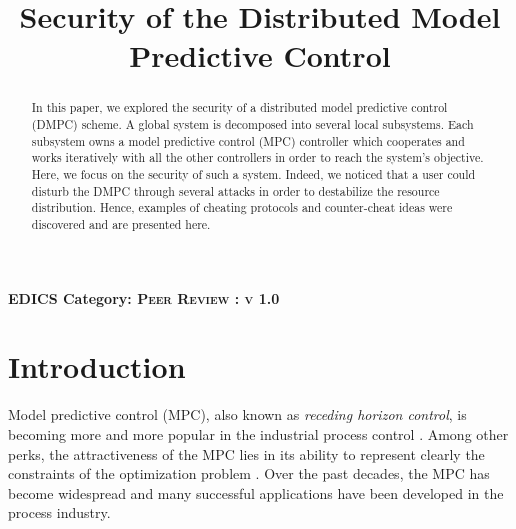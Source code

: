 \documentclass[conference, peerreview]{IEEEtran}
\begin{document}
%
\title{Security of the Distributed Model Predictive Control }


\author{
}

\maketitle
\thispagestyle{plain}
\pagestyle{plain}


\begin{abstract}
In this paper, we explored the security of a distributed model predictive control (DMPC) scheme. A global system is decomposed into several local subsystems. Each subsystem owns a model predictive control (MPC) controller which cooperates and works iteratively with all the other controllers in order to reach the system's objective. Here, we focus on the security of such a system. Indeed, we noticed that a user could disturb the DMPC through several attacks in order to destabilize the resource distribution. Hence, examples of cheating protocols and counter-cheat ideas were discovered and are presented here. 
\end{abstract}

\ifCLASSOPTIONpeerreview
\begin{center} \bfseries EDICS Category: \textsc{ Peer Review  : v 1.0} \end{center}
\fi
%
\IEEEpeerreviewmaketitle



\section{Introduction}
Model predictive control (MPC), also known as \textit{receding horizon control}, is becoming more and more popular in the industrial process control \cite{Venkat, Campo}. Among other perks, the attractiveness of the MPC lies in its ability to represent clearly the constraints of the optimization problem \cite{Jia}. Over the past decades, the MPC has become widespread and many successful applications have been developed in the process industry. 
\end{document}
